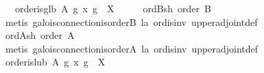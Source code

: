 \begin{isabellebody}
\ \ \ {}order{}is{}glb\ A\ {}g\ x{}\ {}g\ {}\ X{}{}\isanewline
%
\isadelimproof
%
\endisadelimproof
%
\isatagproof
{}\isamarkupfalse%
\ {}\isanewline
\ \ \isamarkupfalse%
\ ord{}Bsh{}\ {}order\ {}B{}{}{}\isanewline
\ \ \ \ \isamarkupfalse%
\ {}metis\ galois{}connection{}is{}order{}B\ la\ ord{}is{}inv\ upper{}adjoint{}def{}\isanewline
\isanewline
\ \ \isamarkupfalse%
\ ord{}Ash{}\ {}order\ {}A{}{}{}\isanewline
\ \ \ \ \isamarkupfalse%
\ {}metis\ galois{}connection{}is{}order{}A\ la\ ord{}is{}inv\ upper{}adjoint{}def{}\isanewline
\isanewline
\ \ \isamarkupfalse%
\ {}order{}is{}lub\ {}A{}{}\ {}g\ x{}\ {}g\ {}\ X{}{}\isanewline

\end{isabellebody}
